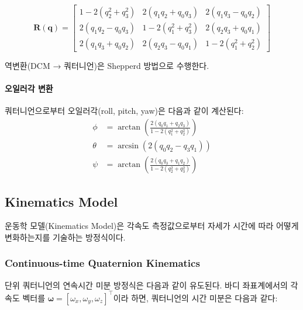                 \begin{equation}
                    \mathbf{R}(\mathbf{q}) = \begin{bmatrix}
                        1 - 2(q_2^2 + q_3^2) & 2(q_1 q_2 + q_0 q_3) & 2(q_1 q_3 - q_0 q_2) \\
                        2(q_1 q_2 - q_0 q_3) & 1 - 2(q_1^2 + q_3^2) & 2(q_2 q_3 + q_0 q_1) \\
                        2(q_1 q_3 + q_0 q_2) & 2(q_2 q_3 - q_0 q_1) & 1 - 2(q_1^2 + q_2^2)
                    \end{bmatrix}
                    \label{eq:quat_to_dcm}
                \end{equation}

                역변환(DCM → 쿼터니언)은 Shepperd 방법으로 수행한다.\\

            \paragraph{오일러각 변환}
                쿼터니언으로부터 오일러각(roll, pitch, yaw)은 다음과 같이 계산된다:\\

                \begin{align}
                    \phi   &= \arctan\!\left(\frac{2(q_0 q_1 + q_2 q_3)}{1 - 2(q_1^2 + q_2^2)}\right) \label{eq:quat_to_roll} \\
                    \theta &= \arcsin\!\left(2(q_0 q_2 - q_3 q_1)\right) \label{eq:quat_to_pitch} \\
                    \psi   &= \arctan\!\left(\frac{2(q_0 q_3 + q_1 q_2)}{1 - 2(q_2^2 + q_3^2)}\right) \label{eq:quat_to_yaw}
                \end{align}

    \subsection{Kinematics Model}
        운동학 모델(Kinematics Model)은 각속도 측정값으로부터 자세가 시간에 따라 어떻게 변화하는지를 기술하는 방정식이다.\\
        
        \subsubsection{Continuous-time Quaternion Kinematics}
            단위 쿼터니언의 연속시간 미분 방정식은 다음과 같이 유도된다. 바디 좌표계에서의 각속도 벡터를 $\boldsymbol{\omega} = [\omega_x, \omega_y, \omega_z]^\top$이라 하면, 쿼터니언의 시간 미분은 다음과 같다:\\

